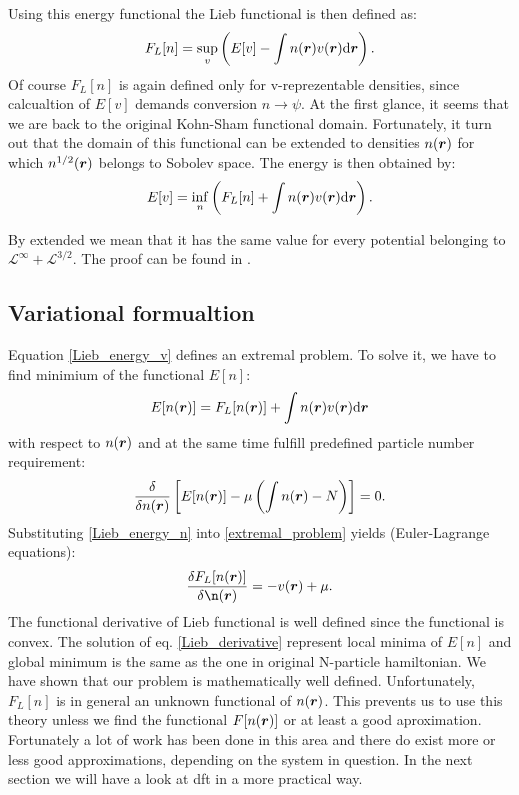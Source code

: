 \documentclass[openany, longbibliography,slovene,a4paper,12pt]{article}
\def\vec#1{\mbox{\boldmath$#1$}}
\newcommand{\dif}{\mathrm{d}}
\begin{document}
  Using this energy functional the Lieb functional is then defined as:
  \begin{equation}
    F_{L}[n] = \sup_{v} \left(  E[v] - \int n(\vec r) v(\vec r) \dif \vec r \right).
  \end{equation}
  Of course $F_{L}[n]$ is again defined only for v-reprezentable densities,
  since calcualtion of $E[v]$ demands conversion $n \rightarrow \psi$. At the
  first glance, it seems that we are back to the original Kohn-Sham functional
  domain. Fortunately, it turn out that the domain of this functional can be
  extended to densities $n(\vec r)$ for which $n^{1/2}(\vec r)$ belongs to
  Sobolev space. The energy is then obtained by:
  \begin{equation} \label{Lieb_energy_v}
    E[v]=\inf_n \left( F_L[n] + \int n(\vec r)v(\vec r)\dif \vec r   \right).
  \end{equation}
  
By extended we mean that it has the same value for every potential belonging to
$\mathcal{L}^{\infty}+ \mathcal{L}^{3/2} $. The proof can be found in \cite{advanced_course}.

  
\subsection{Variational formualtion}
Equation \ref{Lieb_energy_v} defines an extremal problem. To solve it, we have to
find minimium of the functional $E[n]$:
\begin{equation} \label{Lieb_energy_n}
 E[n(\vec r)] =  F_L[n(\vec r)] + \int n(\vec r)v(\vec r)\dif \vec r 
  \end{equation}
 with respect to $n(\vec r)$ and at the same time fulfill predefined particle
 number requirement:
\begin{equation} \label{extremal_problem}
  \frac{\delta }{\delta n(\vec r)} \left[  E[n(\vec r)] - \mu \left(  \int n(\vec r) -N \right)  \right] =0.
\end{equation}
Substituting \ref{Lieb_energy_n} into \ref{extremal_problem} yields
(Euler-Lagrange equations):
\begin{equation} \label{Lieb_derivative}
  \frac{\delta F_L[n(\vec r)]}{\delta \n(\vec r)} = -v(\vec r) + \mu.
  \end{equation}
  The functional derivative of Lieb functional is well defined since the
  functional is convex. The solution of eq. \ref{Lieb_derivative} represent
  local minima of $E[n]$ and global minimum is the same as the one in original
  N-particle hamiltonian. We have shown that our problem is mathematically well
  defined. Unfortunately, $F_L[n]$ is in general an unknown functional of
  $n(\vec r)$. This prevents us to use this theory unless we find the functional
  $F[n (\vec r)]$ or at least a good aproximation. Fortunately a lot of work has
  been done in this area and there do exist more or less good approximations,
  depending on the system in question. In the next section we will have a look at dft in a more practical way.
\end{document}
